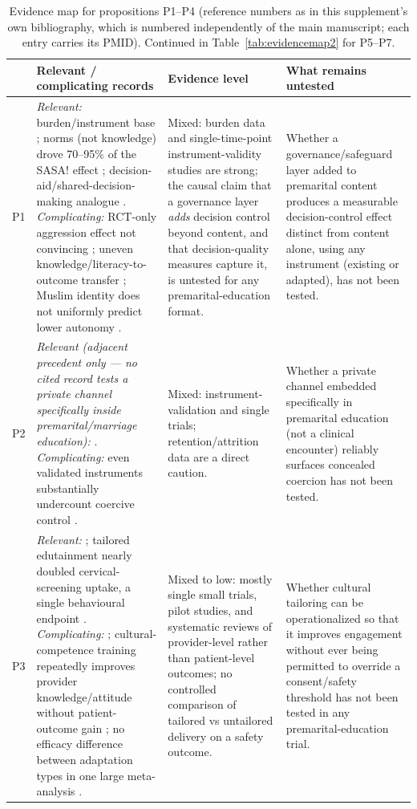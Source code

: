 \documentclass[11pt]{article}
\begin{document}
\begin{table}[H]
\centering\footnotesize
\caption{Evidence map for propositions P1--P4 (reference numbers as in this supplement's own bibliography, which is numbered independently of the main manuscript; each entry carries its PMID). Continued in Table~\ref{tab:evidencemap2} for P5--P7.}
\label{tab:evidencemap}
\begin{tabularx}{\textwidth}{@{}p{0.9cm}YYY@{}}
\toprule
& \textbf{Relevant / complicating records} & \textbf{Evidence level} & \textbf{What remains untested}\\
\midrule
P1 & \emph{Relevant:} burden/instrument base \cite{ref1,ref2,ref5,ref16,ref18,ref92}; norms (not knowledge) drove 70--95\% of the SASA! effect \cite{ref26,ref25}; decision-aid/shared-decision-making analogue \cite{ref14,ref15}. \emph{Complicating:} RCT-only aggression effect not convincing \cite{ref6,ref33,ref7,ref8}; uneven knowledge/literacy-to-outcome transfer \cite{ref34,ref35}; Muslim identity does not uniformly predict lower autonomy \cite{ref93}. & Mixed: burden data and single-time-point instrument-validity studies are strong; the causal claim that a governance layer \emph{adds} decision control beyond content, and that decision-quality measures capture it, is untested for any premarital-education format. & Whether a governance/safeguard layer added to premarital content produces a measurable decision-control effect distinct from content alone, using any instrument (existing or adapted), has not been tested.\\
\addlinespace
P2 & \emph{Relevant (adjacent precedent only --- no cited record tests a private channel specifically inside premarital/marriage education):} \cite{ref94,ref95,ref96,ref97,ref98,ref99}. \emph{Complicating:} even validated instruments substantially undercount coercive control \cite{ref51}. & Mixed: instrument-validation and single trials; retention/attrition data are a direct caution. & Whether a private channel embedded specifically in premarital education (not a clinical encounter) reliably surfaces concealed coercion has not been tested.\\
\addlinespace
P3 & \emph{Relevant:} \cite{ref100,ref101,ref27}; tailored edutainment nearly doubled cervical-screening uptake, a single behavioural endpoint \cite{ref71}. \emph{Complicating:} \cite{ref102,ref103,ref19}; cultural-competence training repeatedly improves provider knowledge/attitude without patient-outcome gain \cite{ref56,ref57,ref55}; no efficacy difference between adaptation types in one large meta-analysis \cite{ref89}. & Mixed to low: mostly single small trials, pilot studies, and systematic reviews of provider-level rather than patient-level outcomes; no controlled comparison of tailored vs untailored delivery on a safety outcome. & Whether cultural tailoring can be operationalized so that it improves engagement without ever being permitted to override a consent/safety threshold has not been tested in any premarital-education trial.\\

\end{tabularx}
\end{table}
\end{document}
